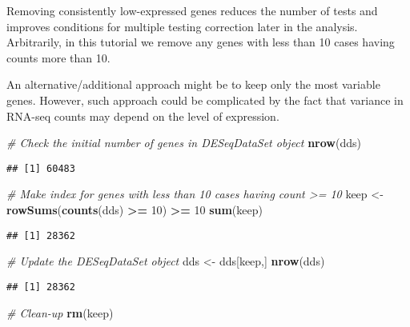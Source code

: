 \documentclass[]{book}
\newenvironment{Shaded}{\begin{snugshade}}{\end{snugshade}}
\newcommand{\KeywordTok}[1]{\textcolor[rgb]{0.13,0.29,0.53}{\textbf{#1}}}
\newcommand{\DecValTok}[1]{\textcolor[rgb]{0.00,0.00,0.81}{#1}}
\newcommand{\StringTok}[1]{\textcolor[rgb]{0.31,0.60,0.02}{#1}}
\newcommand{\CommentTok}[1]{\textcolor[rgb]{0.56,0.35,0.01}{\textit{#1}}}
\newcommand{\OperatorTok}[1]{\textcolor[rgb]{0.81,0.36,0.00}{\textbf{#1}}}
\newcommand{\NormalTok}[1]{#1}
\begin{document}
Removing consistently low-expressed genes reduces the number of tests
and improves conditions for multiple testing correction later in the
analysis. Arbitrarily, in this tutorial we remove any genes with less
than 10 cases having counts more than 10.

An alternative/additional approach might be to keep only the most
variable genes. However, such approach could be complicated by the fact
that variance in RNA-seq counts may depend on the level of expression.

\begin{Shaded}
\begin{Highlighting}[]
\CommentTok{# Check the initial number of genes in DESeqDataSet object}
\KeywordTok{nrow}\NormalTok{(dds)}
\end{Highlighting}
\end{Shaded}

\begin{verbatim}
## [1] 60483
\end{verbatim}

\begin{Shaded}
\begin{Highlighting}[]
\CommentTok{# Make index for genes with less than 10 cases having count >= 10}
\NormalTok{keep <-}\StringTok{ }\KeywordTok{rowSums}\NormalTok{(}\KeywordTok{counts}\NormalTok{(dds) }\OperatorTok{>=}\StringTok{ }\DecValTok{10}\NormalTok{) }\OperatorTok{>=}\StringTok{ }\DecValTok{10}
\KeywordTok{sum}\NormalTok{(keep)}
\end{Highlighting}
\end{Shaded}

\begin{verbatim}
## [1] 28362
\end{verbatim}

\begin{Shaded}
\begin{Highlighting}[]
\CommentTok{# Update the DESeqDataSet object}
\NormalTok{dds <-}\StringTok{ }\NormalTok{dds[keep,]}
\KeywordTok{nrow}\NormalTok{(dds)}
\end{Highlighting}
\end{Shaded}

\begin{verbatim}
## [1] 28362
\end{verbatim}

\begin{Shaded}
\begin{Highlighting}[]
\CommentTok{# Clean-up}
\KeywordTok{rm}\NormalTok{(keep)}
\end{Highlighting}
\end{Shaded}
\end{document}
